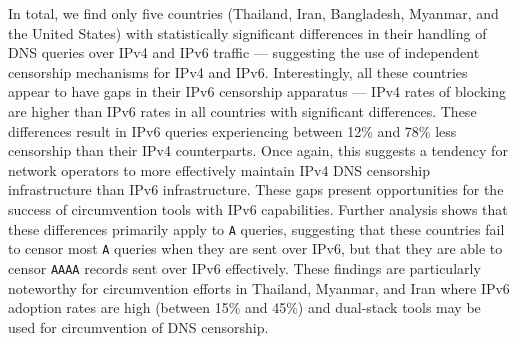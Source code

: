 %
In total, we find only five countries (Thailand, Iran, Bangladesh, Myanmar, and
the United States) with statistically significant differences in their handling
of DNS queries over IPv4 and IPv6 traffic --- suggesting the use of independent
censorship mechanisms for IPv4 and IPv6. 
%
Interestingly, all these countries appear to have gaps in their IPv6 censorship
apparatus --- \ie IPv4 rates of blocking are higher than IPv6 rates in all
countries with significant differences. These differences result in IPv6
queries experiencing between 12\% and 78\% less censorship than their IPv4
counterparts.
%
Once again, this suggests a tendency for network operators to more effectively
maintain IPv4 DNS censorship infrastructure than IPv6 infrastructure. These
gaps present opportunities for the success of circumvention tools with IPv6
capabilities.  
%
Further analysis shows that these differences primarily apply to {\tt A}
queries, suggesting that these countries fail to censor most {\tt A} queries
when they are sent over IPv6, but that they are able to censor
{\tt AAAA} records sent over IPv6 effectively.
%
%
These findings are particularly noteworthy for circumvention
efforts in Thailand, Myanmar, and Iran where IPv6 adoption rates are high
(between 15\% and 45\%) and dual-stack tools may be used for circumvention of
DNS censorship.
%

